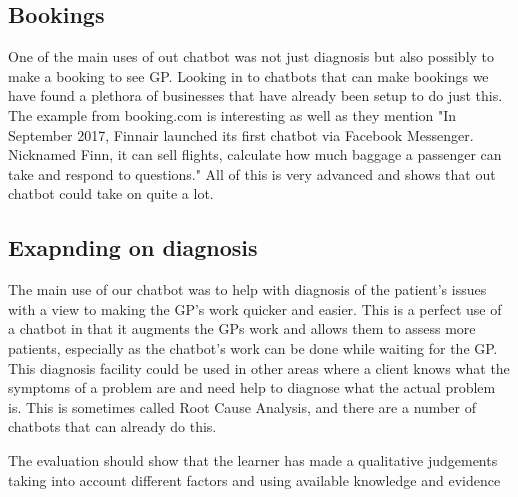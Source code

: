 \documentclass{article}
\begin{document}
\subsection{Bookings}
One of the main uses of out chatbot was not just diagnosis but also possibly to make a booking to see GP. Looking in to chatbots that can make bookings we have found a plethora of businesses that have already been setup to do just this.\cite{futr}\cite{booking}\cite{velma} The example from booking.com is interesting as well as they mention "In September 2017, Finnair launched its first chatbot via Facebook Messenger. Nicknamed Finn, it can sell flights, calculate how much baggage a passenger can take and respond to questions." All of this is very advanced and shows that out chatbot could take on quite a lot.

\subsection{Exapnding on diagnosis}
The main use of our chatbot was to help with diagnosis of the patient's issues with a view to making the GP's work quicker and easier. This is a perfect use of a chatbot in that it augments the GPs work and allows them to assess more patients, especially as the chatbot's work can be done while waiting for the GP. 
This diagnosis facility could be used in other areas where a client knows what the symptoms of a problem are and need help to diagnose what the actual problem is. This is sometimes called Root Cause Analysis, and there are a number of chatbots that can already do this. \cite{gyan}\cite{devops}

The evaluation should show that the
learner has made a qualitative judgements taking into account different factors and using available knowledge and evidence




\end{document}
